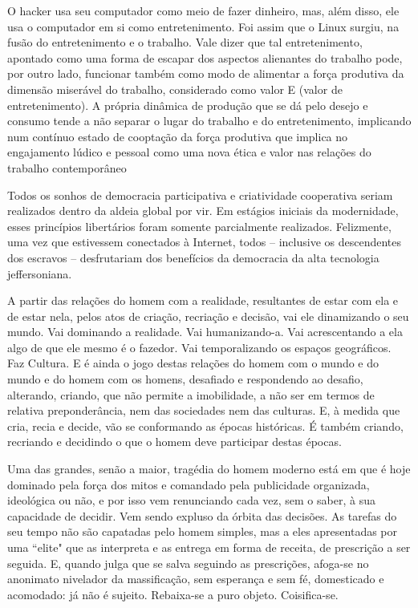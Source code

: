 \begin{citacao}
O hacker usa seu computador como meio de fazer dinheiro, mas, além disso, ele usa o computador em si como entretenimento. Foi assim que o Linux surgiu, na fusão do entretenimento e o trabalho.
Vale dizer que tal entretenimento, apontado como uma forma de escapar dos aspectos alienantes do trabalho pode, por outro lado, funcionar também como modo de alimentar a força produtiva da dimensão miserável do trabalho, considerado como valor E (valor de entretenimento). A própria dinâmica de produção que se dá pelo desejo e consumo tende a não separar o lugar do trabalho e do entretenimento, implicando num contínuo estado de cooptação da força produtiva que implica no engajamento lúdico e pessoal como uma nova ética e valor nas relações do trabalho contemporâneo
\end{citacao}


\begin{citacao}
Todos os sonhos de democracia participativa e criatividade cooperativa seriam realizados dentro da aldeia global por vir. Em estágios iniciais da modernidade, esses princípios libertários foram somente parcialmente realizados. Felizmente, uma vez que estivessem conectados à Internet, todos – inclusive os descendentes dos escravos – desfrutariam dos benefícios da democracia da alta tecnologia jeffersoniana.
\end{citacao}
  
 \begin{citacao}
 
   A partir das relações do homem com a realidade, resultantes de estar com ela e de estar nela, pelos atos de criação, recriação e decisão, vai ele dinamizando o seu mundo. Vai dominando a realidade. Vai humanizando-a. Vai acrescentando a ela algo de que ele mesmo é o fazedor. Vai temporalizando os espaços geográficos. Faz Cultura. E é ainda o jogo destas relações do homem com o mundo e do mundo e do homem com os homens, desafiado e respondendo ao desafio, alterando, criando, que não permite a imobilidade, a não ser em termos de relativa preponderância, nem das sociedades nem das culturas. E, à medida que cria, recia e decide, vão se conformando as épocas históricas. É também criando, recriando e decidindo o que o homem deve participar destas épocas. \cite[60]{Freire2015}
    \end{citacao} 

   \begin{citacao}
   Uma das grandes, senão a maior, tragédia do homem moderno está em que é hoje dominado pela força dos mitos e comandado pela publicidade organizada, ideológica ou não, e por isso vem renunciando cada vez, sem o saber, à sua capacidade de decidir. Vem sendo expluso da órbita das decisões. As tarefas do seu tempo não são capatadas pelo homem simples, mas a eles apresentadas por uma ``elite" que as interpreta e as entrega em forma de receita, de prescrição a ser seguida. E, quando julga que se salva seguindo as prescrições, afoga-se no anonimato nivelador da massificação, sem esperança e sem fé, domesticado e acomodado: já não é sujeito. Rebaixa-se a puro objeto. Coisifica-se. \cite[60]{Freire2015}
 \end{citacao} 

